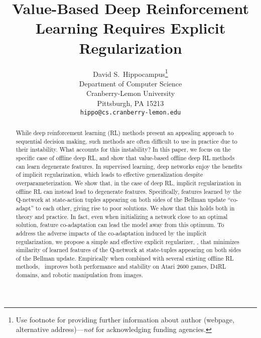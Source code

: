 \documentclass{article}
\title{Value-Based Deep Reinforcement Learning Requires Explicit Regularization}
\author{%
  David S.~Hippocampus\thanks{Use footnote for providing further information
    about author (webpage, alternative address)---\emph{not} for acknowledging
    funding agencies.} \\
  Department of Computer Science\\
  Cranberry-Lemon University\\
  Pittsburgh, PA 15213 \\
  \texttt{hippo@cs.cranberry-lemon.edu} \\
}
\begin{document}
\maketitle

\begin{abstract}


While deep reinforcement learning (RL) methods present an appealing approach to sequential decision making, such methods are often difficult to use in practice due to their instability. What accounts for this instability? In this paper, we focus on the specific case of offline deep RL, and show that value-based offline deep RL methods can learn degenerate features. In supervised learning, deep networks enjoy the benefits of implicit regularization, which leads to effective generalization despite overparameterization. We show that, in the case of deep RL, implicit regularization in offline RL can instead lead to degenerate features.
Specifically, features learned by the Q-network at state-action tuples appearing on both sides of the Bellman update ``co-adapt'' to each other, giving rise to poor
solutions. We show that this holds both in theory and practice. In fact, even when initializing a network close to an optimal solution, feature co-adaptation
can lead the model away from this optimum. To address the adverse impacts of the co-adaptation induced by the implicit regularization, we propose a simple and effective explicit regularizer, \methodname, that  minimizes similarity of learned features of the Q-network at state-tuples appearing on both sides of the Bellman update. Empirically when combined with several existing offline RL methods, \methodname\ improves both performance and stability on Atari 2600 games, D4RL domains, and robotic manipulation from images.
\end{abstract}











\end{document}
